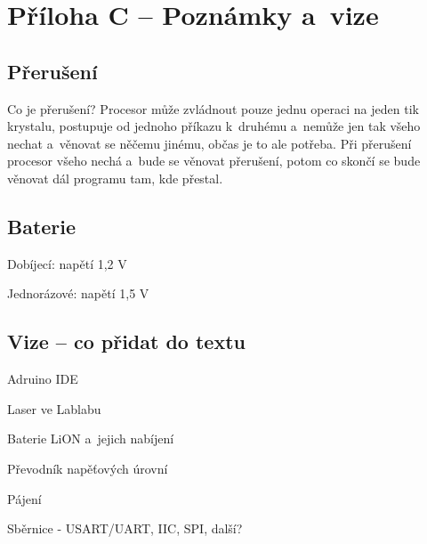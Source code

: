 




\section*{Příloha C -- Poznámky a~vize}



\subsection*{Přerušení}

Co je přerušení? Procesor může zvládnout pouze jednu operaci na jeden tik krystalu, 
postupuje od jednoho příkazu k~druhému a~nemůže jen tak všeho nechat a~věnovat se něčemu jinému, občas je to ale potřeba.
 Při přerušení procesor všeho nechá a~bude se věnovat přerušení, potom co skončí se bude věnovat dál programu tam, kde přestal. 

\subsection*{Baterie}

Dobíjecí: napětí 1,2 V~

Jednorázové: napětí 1,5 V~
 

\subsection*{Vize -- co přidat do textu}

Adruino IDE 

Laser ve Lablabu 

Baterie LiON a~jejich nabíjení 

Převodník napěťových úrovní 

Pájení 

Sběrnice - USART/UART, IIC, SPI, další?






